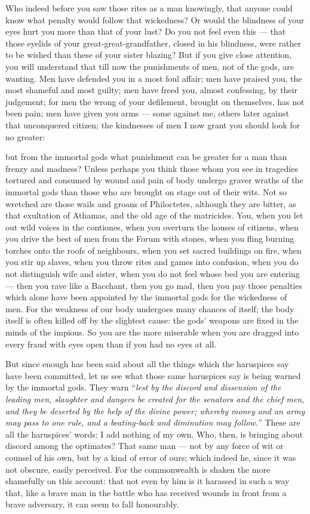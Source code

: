  Who indeed before you saw those rites as a man knowingly, that anyone could know what penalty would follow that wickedness? Or would the blindness of your eyes hurt you more than that of your lust? Do you not feel even this --- that those eyelids of your great-great-grandfather, closed in his blindness, were rather to be wished than these of your sister blazing? But if you give close attention, you will understand that till now the punishments of men, not of the gods, are wanting. Men have defended you in a most foul affair; men have praised you, the most shameful and most guilty; men have freed you, almost confessing, by their judgement; for men the wrong of your defilement, brought on themselves, has not been pain; men have given you arms --- some against me, others later against that unconquered citizen; the kindnesses of men I now grant you should look for no greater:

 but from the immortal gods what punishment can be greater for a man than frenzy and madness? Unless perhaps you think those whom you see in tragedies tortured and consumed by wound and pain of body undergo graver wraths of the immortal gods than those who are brought on stage out of their wits. Not so wretched are those wails and groans of Philoctetes, although they are bitter, as that exultation of Athamas, and the old age of the matricides. You, when you let out wild voices in the contiones, when you overturn the houses of citizens, when you drive the best of men from the Forum with stones, when you fling burning torches onto the roofs of neighbours, when you set sacred buildings on fire, when you stir up slaves, when you throw rites and games into confusion, when you do not distinguish wife and sister, when you do not feel whose bed you are entering --- then you rave like a Bacchant, then you go mad, then you pay those penalties which alone have been appointed by the immortal gods for the wickedness of men. For the weakness of our body undergoes many chances of itself; the body itself is often killed off by the slightest cause: the gods' weapons are fixed in the minds of the impious. So you are the more miserable when you are dragged into every fraud with eyes open than if you had no eyes at all.

 But since enough has been said about all the things which the haruspices say have been committed, let us see what those same haruspices say is being warned by the immortal gods. They warn ``\textit{lest by the discord and dissension of the leading men, slaughter and dangers be created for the senators and the chief men, and they be deserted by the help of the divine power; whereby money and an army may pass to one rule, and a beating-back and diminution may follow.}'' These are all the haruspices' words: I add nothing of my own. Who, then, is bringing about discord among the optimates? That same man --- not by any force of wit or counsel of his own, but by a kind of error of ours; which indeed he, since it was not obscure, easily perceived. For the commonwealth is shaken the more shamefully on this account: that not even by him is it harassed in such a way that, like a brave man in the battle who has received wounds in front from a brave adversary, it can seem to fall honourably.

